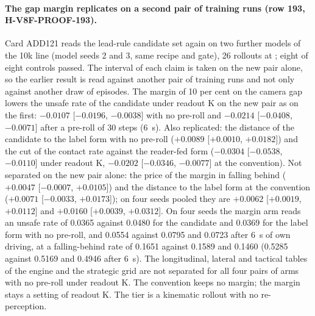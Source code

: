 \paragraph{The gap margin replicates on a second pair of training runs (row 193, H-V8F-PROOF-193).} Card ADD121 reads the lead-rule candidate set again on two further models of the 10k line (model seeds 2 and 3, same recipe and gate), 26 rollouts at ; eight of eight controls passed. The interval of each claim is taken on the new pair alone, so the earlier result is read against another pair of training runs and not only against another draw of episodes. The margin of 10 per cent on the camera gap lowers the unsafe rate of the candidate under readout K on the new pair as on the first: $-0.0107$ [$-0.0196$, $-0.0038$] with no pre-roll and $-0.0214$ [$-0.0408$, $-0.0071$] after a pre-roll of 30 steps (6~s). Also replicated: the distance of the candidate to the label form with no pre-roll ($+0.0089$ [$+0.0010$, $+0.0182$]) and the cut of the contact rate against the reader-fed form ($-0.0304$ [$-0.0538$, $-0.0110$] under readout K, $-0.0202$ [$-0.0346$, $-0.0077$] at the convention). Not separated on the new pair alone: the price of the margin in falling behind ($+0.0047$ [$-0.0007$, $+0.0105$]) and the distance to the label form at the convention ($+0.0071$ [$-0.0033$, $+0.0173$]); on four seeds pooled they are $+0.0062$ [$+0.0019$, $+0.0112$] and $+0.0160$ [$+0.0039$, $+0.0312$]. On four seeds the margin arm reads an unsafe rate of 0.0365 against 0.0480 for the candidate and 0.0369 for the label form with no pre-roll, and 0.0554 against 0.0795 and 0.0723 after 6~s of own driving, at a falling-behind rate of 0.1651 against 0.1589 and 0.1460 (0.5285 against 0.5169 and 0.4946 after 6~s). The longitudinal, lateral and tactical tables of the engine and the strategic grid are not separated for all four pairs of arms with no pre-roll under readout K. The convention keeps no margin; the margin stays a setting of readout K. The tier is a kinematic rollout with no re-perception.

